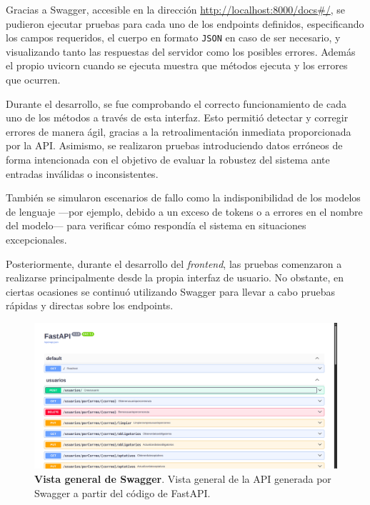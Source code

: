 Gracias a Swagger, accesible en la dirección \href{http://localhost:8000/docs\#/}{http://localhost:8000/docs\#/}, se pudieron ejecutar pruebas para cada uno de los endpoints definidos, especificando los campos requeridos, el cuerpo en formato \texttt{JSON} en caso de ser necesario, y visualizando tanto las respuestas del servidor como los posibles errores. Además el propio uvicorn cuando se ejecuta muestra que métodos ejecuta y los errores que ocurren.

Durante el desarrollo, se fue comprobando el correcto funcionamiento de cada uno de los métodos a través de esta interfaz. Esto permitió detectar y corregir errores de manera ágil, gracias a la retroalimentación inmediata proporcionada por la API. Asimismo, se realizaron pruebas introduciendo datos erróneos de forma intencionada con el objetivo de evaluar la robustez del sistema ante entradas inválidas o inconsistentes.

También se simularon escenarios de fallo como la indisponibilidad de los modelos de lenguaje —por ejemplo, debido a un exceso de tokens o a errores en el nombre del modelo— para verificar cómo respondía el sistema en situaciones excepcionales.

Posteriormente, durante el desarrollo del \textit{frontend}, las pruebas comenzaron a realizarse principalmente desde la propia interfaz de usuario. No obstante, en ciertas ocasiones se continuó utilizando Swagger para llevar a cabo pruebas rápidas y directas sobre los endpoints.

\begin{figure}[H]
	\centering
	\includegraphics[width=1\linewidth]{imagenes/swagger1.png}
	\caption[\textbf{Vista general de Swagger}.]{\textbf{Vista general de Swagger}. Vista general de la API generada por Swagger a partir del código de FastAPI.}
	\label{swagger-1}
\end{figure}

